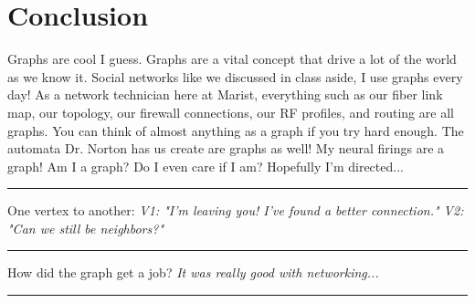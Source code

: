 \documentclass[letterpaper, 10pt]{article}
\begin{document}


\section{Conclusion}
Graphs are cool I guess. Graphs are a vital concept that drive a lot of the world as we know it. Social networks like we discussed in class aside, I use graphs every day! As a network technician here at Marist, everything such as our fiber link map, our topology, our firewall connections, our RF profiles, and routing are all graphs. You can think of almost anything as a graph if you try hard enough. The automata Dr. Norton has us create are graphs as well! My neural firings are a graph! Am I a graph? Do I even care if I am? Hopefully I'm directed... \\

\hrule
\vspace{.25cm}
One vertex to another: \textit{V1: "I'm leaving you! I've found a better connection." V2: "Can we still be neighbors?"}
\vspace{.25cm}
\hrule
\vspace{.25cm}
How did the graph get a job? \textit{It was really good with networking...}
\vspace{.25cm}
\hrule
\end{document}
